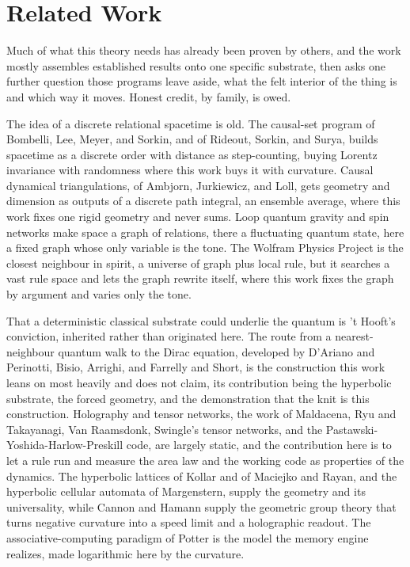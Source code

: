 \section{Related Work}

Much of what this theory needs has already been proven by others, and the work mostly assembles established results onto one specific substrate, then asks one further question those programs leave aside, what the felt interior of the thing is and which way it moves. Honest credit, by family, is owed.

The idea of a discrete relational spacetime is old. The causal-set program of Bombelli, Lee, Meyer, and Sorkin, and of Rideout, Sorkin, and Surya, builds spacetime as a discrete order with distance as step-counting, buying Lorentz invariance with randomness where this work buys it with curvature. Causal dynamical triangulations, of Ambjorn, Jurkiewicz, and Loll, gets geometry and dimension as outputs of a discrete path integral, an ensemble average, where this work fixes one rigid geometry and never sums. Loop quantum gravity and spin networks make space a graph of relations, there a fluctuating quantum state, here a fixed graph whose only variable is the tone. The Wolfram Physics Project is the closest neighbour in spirit, a universe of graph plus local rule, but it searches a vast rule space and lets the graph rewrite itself, where this work fixes the graph by argument and varies only the tone.

That a deterministic classical substrate could underlie the quantum is 't Hooft's conviction, inherited rather than originated here. The route from a nearest-neighbour quantum walk to the Dirac equation, developed by D'Ariano and Perinotti, Bisio, Arrighi, and Farrelly and Short, is the construction this work leans on most heavily and does not claim, its contribution being the hyperbolic substrate, the forced geometry, and the demonstration that the knit is this construction. Holography and tensor networks, the work of Maldacena, Ryu and Takayanagi, Van Raamsdonk, Swingle's tensor networks, and the Pastawski-Yoshida-Harlow-Preskill code, are largely static, and the contribution here is to let a rule run and measure the area law and the working code as properties of the dynamics. The hyperbolic lattices of Kollar and of Maciejko and Rayan, and the hyperbolic cellular automata of Margenstern, supply the geometry and its universality, while Cannon and Hamann supply the geometric group theory that turns negative curvature into a speed limit and a holographic readout. The associative-computing paradigm of Potter is the model the memory engine realizes, made logarithmic here by the curvature.


